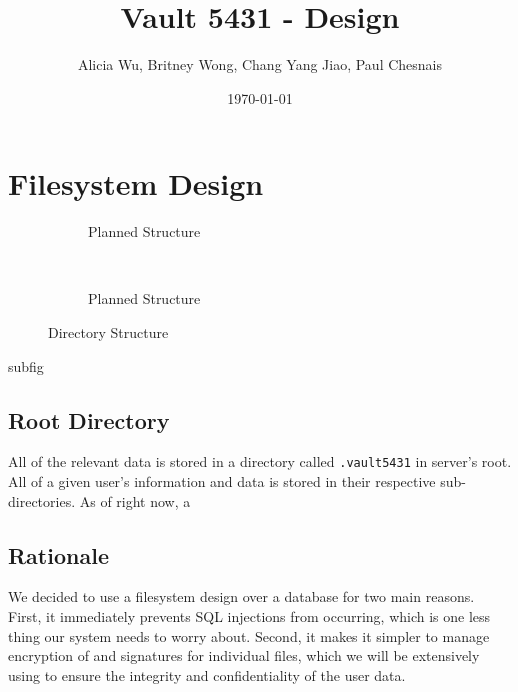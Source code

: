 \documentclass{article}
\title{Vault 5431 - Design}
\author{Alicia Wu, Britney Wong, Chang Yang Jiao, Paul Chesnais}
\date{\today}
\begin{document}
\maketitle
\thispagestyle{empty}
\section{Filesystem Design}

\begin{figure}[H]
  \centering
  \begin{subfigure}[b]{0.3\textwidth}
    \caption{Planned Structure}
  \end{subfigure}~
  \begin{subfigure}[b]{0.3\textwidth}

    \caption{Planned Structure}
  \end{subfigure}
  \caption{Directory Structure}
  \label{fig:directory_structure}
\end{figure}

subfig

\subsection{Root Directory}
\par All of the relevant data is stored in a directory called \texttt{.vault5431} in server's root. All of a given user's information and data is stored in their respective sub-directories. As of right now, a
\subsection{Rationale}
\par We decided to use a filesystem design over a database for two main reasons. First, it immediately prevents SQL injections from occurring, which is one less thing our system needs to worry about. Second, it makes it simpler to manage encryption of and signatures for individual files, which we will be extensively using to ensure the integrity and confidentiality of the user data.
\end{document}
